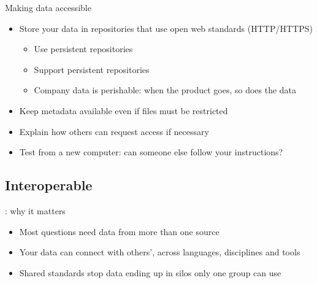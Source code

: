 \documentclass[aspectratio=169]{beamer}
\begin{document}
\begin{frame}{Making data accessible}
\begin{itemize}
  \item Store your data in repositories that use open web standards (HTTP/HTTPS)
    \begin{itemize}
    \item Use persistent repositories
    \item Support persistent repositories
    \item Company data is perishable: when the product goes, so does the data
    \end{itemize}
  \item Keep metadata available even if files must be restricted
  \item Explain how others can request access if necessary
  \item Test from a new computer: can someone else follow your instructions?
\end{itemize}
\end{frame}

\subsection{Interoperable}
\begin{frame}{: why it matters}
\begin{itemize}
  \item Most questions need data from more than one source
  \item Your data can connect with others', across languages, disciplines and tools
  \item Shared standards stop data ending up in silos only one group can use
\end{itemize}
\end{frame}
\end{document}
